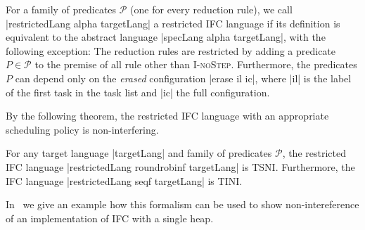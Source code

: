   
  


\begin{definition}
  \label{def:restricted}
  For a family of predicates $\mathcal P$ (one for every reduction
  rule), we call
  |restrictedLang alpha targetLang| a restricted IFC language
  if its definition is equivalent to the abstract language
  |specLang alpha targetLang|, with the following exception:
  The reduction rules are restricted
  by adding a predicate $P \in \mathcal P$ to the premise of
  all rule other than \textsc{I-noStep}.  Furthermore, the predicates $P$
  can depend only on the \textit{erased} configuration
  |erase il ic|, where |il| is the label of the first task
  in the task list and |ic| the full configuration.
\end{definition}

By the following theorem, the restricted IFC language with an
appropriate scheduling policy is non-interfering.

\begin{theorem}
  \label{thm:restricted}
  For any target language |targetLang| and family of predicates
  $\mathcal{P}$, the restricted IFC language |restrictedLang roundrobinf targetLang|
  is TSNI.  Furthermore, the IFC language
  |restrictedLang seqf targetLang| is TINI.
\end{theorem}

In~ we give an example how this formalism can be used
to show non-intereference of an implementation of IFC with a single heap.


